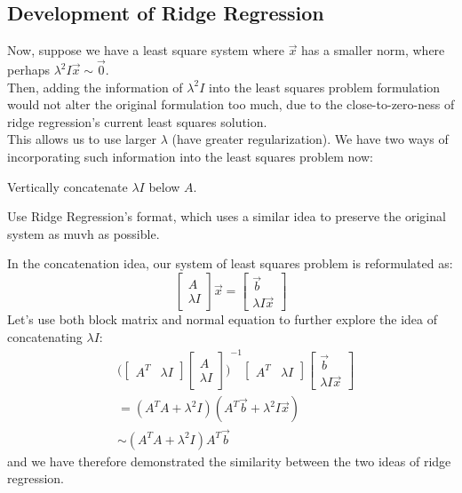 \subsection{Development of Ridge Regression}
Now, suppose we have a least square system where $\vec{x}$ has a smaller norm, where perhaps $\lambda^2 I \vec{x} \sim \vec{0}$. \\
Then, adding the information of $\lambda^2 I$ into the least squares problem formulation would not alter the original formulation too much, due to the close-to-zero-ness of ridge regression's current least squares solution. \\
This allows us to use larger $\lambda$ (have greater regularization). We have two ways of incorporating such information into the least squares problem now:
\begin{bindenum}
    \item Vertically concatenate $\lambda I$ below $A$.
    \item Use Ridge Regression's format, which uses a similar idea to preserve the original system as muvh as possible.
\end{bindenum}
In the concatenation idea, our system of least squares problem is reformulated as:
\[
    \begin{bmatrix} A \\ \lambda I \end{bmatrix} \vec{x} = \begin{bmatrix} \vec{b} \\ \lambda I \vec{x} \end{bmatrix}
\]
Let's use both block matrix and normal equation to further explore the idea of concatenating $\lambda I$:
\begin{align*}
    &{\bigg( \begin{bmatrix} A^T & \lambda I \end{bmatrix} \begin{bmatrix} A \\ \lambda I \end{bmatrix} \bigg)}^{-1}
    \begin{bmatrix} A^T & \lambda I \end{bmatrix} \begin{bmatrix} \vec{b} \\ \lambda I \vec{x} \end{bmatrix} \\
    &= (A^T A + \lambda^2 I) (A^T \vec{b} + \lambda^2 I \vec{x}) \\
    &\sim (A^T A + \lambda^2 I) A^T \vec{b}
\end{align*}
and we have therefore demonstrated the similarity between the two ideas of ridge regression.

